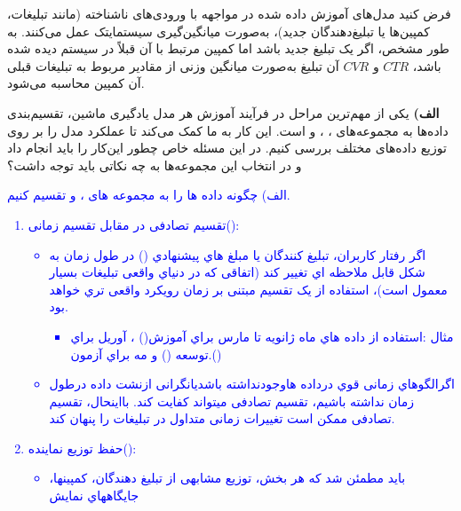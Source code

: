 \documentclass[12pt]{article}
\begin{document}
\begin{enumerate}
    فرض کنید مدل‌های آموزش داده شده در مواجهه با ورودی‌های ناشناخته (مانند تبلیغات، کمپین‌ها یا تبلیغ‌دهندگان جدید)، به‌صورت میانگین‌گیری سیستمایتک عمل می‌کنند. به طور مشخص، اگر یک تبلیغ جدید باشد اما کمپین مرتبط با آن قبلاً در سیستم دیده شده باشد، \( CTR \) و \( CVR \) آن تبلیغ به‌صورت میانگین وزنی از مقادیر مربوط به تبلیغات قبلی آن کمپین محاسبه می‌شود.
    
    \textbf{الف)}
    یکی از مهم‌ترین مراحل در فرآیند آموزش هر مدل یادگیری ماشین، تقسیم‌بندی داده‌ها به مجموعه‌های ، ،  و  است. این کار به ما کمک می‌کند تا عملکرد مدل را بر روی توزیع داده‌های مختلف بررسی کنیم. در این مسئله خاص چطور این‌کار را باید انجام داد و در انتخاب این مجموعه‌ها به چه نکاتی باید توجه داشت؟

    \textcolor{blue}{
    الف) چگونه داده ها را به مجموعه های ،  و  تقسیم کنیم.\\
    \begin{enumerate}
        \item تقسیم تصادفی در مقابل تقسیم زمانی():\\
            \begin{itemize}
                \item اگر رفتار کاربران، تبلیغ کنندگان یا مبلغ هاي پیشنهادي () در طول زمان به شکل قابل ملاحظه اي تغییر
                کند (اتفاقی که در دنیاي واقعی تبلیغات بسیار معمول است)، استفاده از یک تقسیم مبتنی بر زمان رویکرد
                 واقعی تري خواهد بود.
                 \begin{itemize}
                     \item مثال :استفاده از داده هاي ماه ژانویه تا مارس براي آموزش() ، آوریل براي توسعه ()
                        و مه براي آزمون.()
                 \end{itemize}
                 \item اگرالگوهاي زمانی قوي درداده هاوجودنداشته باشدیانگرانی ازنشت داده درطول زمان نداشته باشیم،
                تقسیم تصادفی میتواند کفایت کند. بااینحال، تقسیم تصادفی ممکن است تغییرات زمانی متداول در
                 تبلیغات را پنهان کند.
            \end{itemize}
        \item حفظ توزیع نماینده():\\
        \begin{itemize}
            \item باید مطمئن شد که هر بخش، توزیع مشابهی از تبلیغ دهندگان، کمپینها، جایگاههاي نمایش

\end{itemize}
\end{enumerate}}
\end{enumerate}
\end{document}
